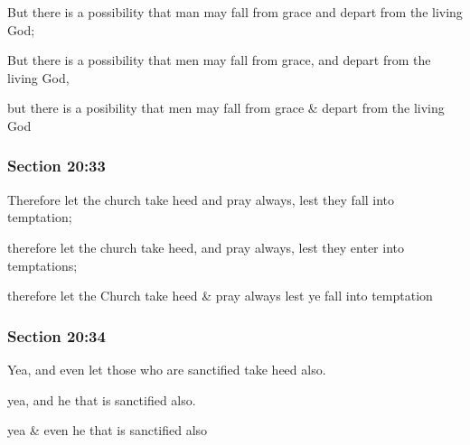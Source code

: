 		But there is a possibility that man may fall from grace and depart from the living God;

		\begin{framed}
		\scriptsize
			\begin{compactdesc}
				\item[JSP] But there is a possibility that men may fall from grace, and depart from the living God,
				\item[RB1] but there is a posibility that men may fall from grace \& depart from the living God
			\end{compactdesc}
		\end{framed}

	\subsubsection{Section 20:33} %
		\label{DC20-33}

		Therefore let the church take heed and pray always, lest they fall into temptation;

		\begin{framed}
		\scriptsize
			\begin{compactdesc}
				\item[JSP] therefore let the church take heed, and pray always, lest they enter into temptations;
				\item[RB1] therefore let the Church take heed \& pray always lest ye fall into temptation
			\end{compactdesc}
		\end{framed}

	\subsubsection{Section 20:34} %
		\label{DC20-34}

		Yea, and even let those who are sanctified take heed also.

		\begin{framed}
		\scriptsize
			\begin{compactdesc}
				\item[JSP] yea, and he that is sanctified also.
				\item[RB1] yea \& even he that is sanctified also
			\end{compactdesc}
		\end{framed}

